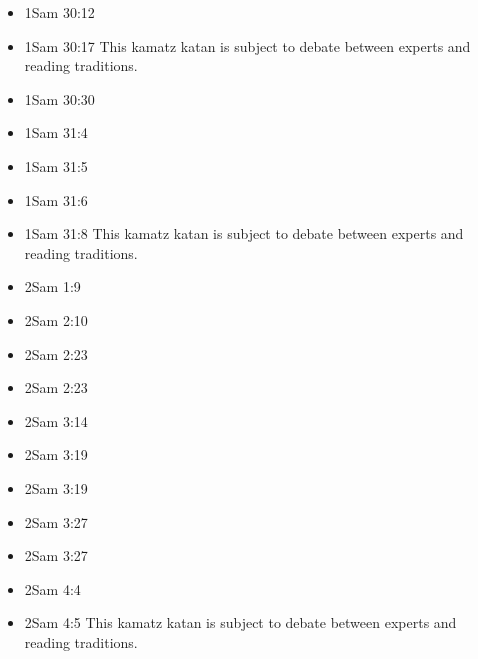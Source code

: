 \documentclass[14pt]{article}
\begin{document}
\begin{multicols}{2}
\begin{itemize}
							\item 1Sam 30:12
							
							\item 1Sam 30:17 This kamatz katan is subject to debate between experts and reading traditions.
							
							\item 1Sam 30:30
							
							\item 1Sam 31:4
							
							\item 1Sam 31:5
							
							\item 1Sam 31:6
							
							\item 1Sam 31:8 This kamatz katan is subject to debate between experts and reading traditions.
							
							\item 2Sam 1:9
							
							\item 2Sam 2:10
							
							\item 2Sam 2:23
							
							\item 2Sam 2:23
							
							\item 2Sam 3:14
							
							\item 2Sam 3:19
							
							\item 2Sam 3:19
							
							\item 2Sam 3:27
							
							\item 2Sam 3:27
							
							\item 2Sam 4:4
							
							\item 2Sam 4:5 This kamatz katan is subject to debate between experts and reading traditions.
							

\end{itemize}
\end{multicols}
\end{document}
